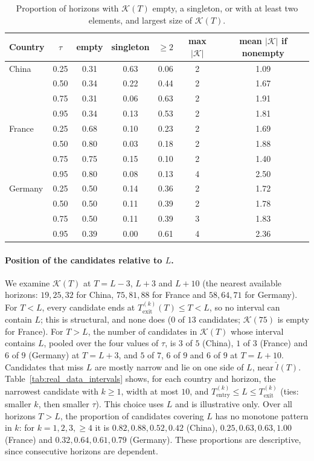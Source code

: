 \documentclass[12pt,a4paper]{article}
\begin{document}
\begin{table}[htbp]
	\centering
	\small
	\caption{Proportion of horizons with $\mathcal K(T)$ empty, a
		singleton, or with at least two elements, and largest size of
		$\mathcal K(T)$.}
	\label{tab:real_K_props}
	\begin{tabular}{lcccccc}
		\toprule
		Country & $\tau$ & empty & singleton & $\ge2$ & max $|\mathcal K|$
		& mean $|\mathcal K|$ if nonempty \\
		\midrule
		China & 0.25 & 0.31 & 0.63 & 0.06 & 2 & 1.09 \\
		& 0.50 & 0.34 & 0.22 & 0.44 & 2 & 1.67 \\
		& 0.75 & 0.31 & 0.06 & 0.63 & 2 & 1.91 \\
		& 0.95 & 0.34 & 0.13 & 0.53 & 2 & 1.81 \\
		\midrule
		France & 0.25 & 0.68 & 0.10 & 0.23 & 2 & 1.69 \\
		& 0.50 & 0.80 & 0.03 & 0.18 & 2 & 1.88 \\
		& 0.75 & 0.75 & 0.15 & 0.10 & 2 & 1.40 \\
		& 0.95 & 0.80 & 0.08 & 0.13 & 4 & 2.50 \\
		\midrule
		Germany & 0.25 & 0.50 & 0.14 & 0.36 & 2 & 1.72 \\
		& 0.50 & 0.50 & 0.11 & 0.39 & 2 & 1.78 \\
		& 0.75 & 0.50 & 0.11 & 0.39 & 3 & 1.83 \\
		& 0.95 & 0.39 & 0.00 & 0.61 & 4 & 2.36 \\
		\bottomrule
	\end{tabular}
\end{table}

\paragraph{Position of the candidates relative to $L$.}
We examine $\mathcal K(T)$ at $T=L-3$, $L+3$ and $L+10$ (the nearest
available horizons: $19,25,32$ for China, $75,81,88$ for France and
$58,64,71$ for Germany). For $T<L$, every candidate ends at
$T_{\mathrm{exit}}^{(k)}(T)\le T<L$, so no interval can contain $L$;
this is structural, and none does ($0$ of $13$ candidates; $\mathcal K(75)$
is empty for France). For $T>L$, the number of candidates in
$\mathcal K(T)$ whose interval contains $L$, pooled over the
four values of $\tau$, is $3$ of $5$ (China), $1$ of $3$ (France) and
$6$ of $9$ (Germany) at $T=L+3$, and $5$ of $7$, $6$ of $9$ and $6$ of
$9$ at $T=L+10$. Candidates that miss $L$ are mostly narrow and lie on one side of $L$,
near $\hat l(T)$. Table~\ref{tab:real_data_intervals} shows, for each
country and horizon, the narrowest candidate with $k\ge1$, width at most $10$, and
$T_{\mathrm{entry}}^{(k)}\le L\le T_{\mathrm{exit}}^{(k)}$ (ties: smaller $k$,
then smaller $\tau$).
This choice uses $L$ and is illustrative only. Over all horizons $T>L$, the proportion of candidates covering $L$ has no monotone pattern in $k$: for $k=1,2,3,\ge4$ it is $0.82,0.88,0.52,0.42$ (China), $0.25,0.63,0.63,1.00$ (France) and
$0.32,0.64,0.61,0.79$ (Germany). These proportions are descriptive,
since consecutive horizons are dependent.
\end{document}
